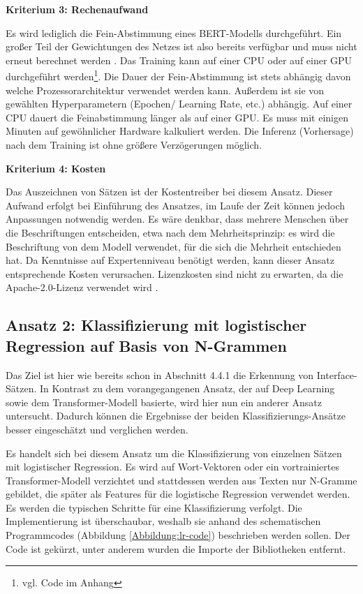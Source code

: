 {\bf Kriterium 3: Rechenaufwand}

Es wird lediglich die Fein-Abstimmung eines BERT-Modells durchgeführt. Ein großer Teil der Gewichtungen des Netzes ist also bereits verfügbar und muss nicht erneut berechnet werden \cite{bert}.
Das Training kann auf einer CPU oder auf einer GPU durchgeführt werden\footnote{vgl. Code im Anhang}. Die Dauer der Fein-Abstimmung ist stets abhängig davon welche Prozessorarchitektur verwendet werden kann. Außerdem ist sie von gewählten Hyperparametern (Epochen/ Learning Rate, etc.) abhängig. Auf einer CPU dauert die Feinabstimmung länger als auf einer GPU. Es muss mit einigen Minuten auf gewöhnlicher Hardware kalkuliert werden. Die Inferenz (Vorhersage) nach dem Training ist ohne größere Verzögerungen möglich.

{\bf Kriterium 4: Kosten}

Das Auszeichnen von Sätzen ist der Kostentreiber bei diesem Ansatz. Dieser Aufwand erfolgt bei Einführung des Ansatzes, im Laufe der Zeit können jedoch Anpassungen notwendig werden. Es wäre denkbar, dass mehrere Menschen über die Beschriftungen entscheiden, etwa nach dem Mehrheitsprinzip: es wird die Beschriftung von dem Modell verwendet, für die sich die Mehrheit entschieden hat. Da Kenntnisse auf Expertenniveau benötigt werden, kann dieser Ansatz entsprechende Kosten verursachen. Lizenzkosten sind nicht zu erwarten, da die Apache-2.0-Lizenz verwendet wird \cite{bert}.

\subsection{Ansatz 2: Klassifizierung mit logistischer Regression auf Basis von N-Grammen}

Das Ziel ist hier wie bereits schon in Abschnitt 4.4.1 die Erkennung von Interface-Sätzen. In Kontrast zu dem vorangegangenen Ansatz, der auf Deep Learning sowie dem Transformer-Modell basierte, wird hier nun ein anderer Ansatz untersucht. Dadurch können die Ergebnisse der beiden Klassifizierungs-Ansätze besser eingeschätzt und verglichen werden. 

Es handelt sich bei diesem Ansatz um die Klassifizierung von einzelnen Sätzen mit logistischer Regression. Es wird auf Wort-Vektoren oder ein vortrainiertes Transformer-Modell verzichtet und stattdessen werden aus Texten nur N-Gramme gebildet, die später als Features für die logistische Regression verwendet werden. Es werden die typischen Schritte \cite[S. 124]{Gupta} für eine Klassifizierung verfolgt. Die Implementierung ist überschaubar, weshalb sie anhand des schematischen Programmcodes (Abbildung \ref{Abbildung:lr-code}) beschrieben werden sollen. Der Code ist gekürzt, unter anderem wurden die Importe der Bibliotheken entfernt.

